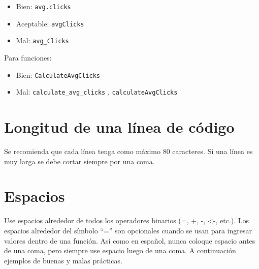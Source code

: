 \documentclass[10pt,]{krantz}
\begin{document}
\begin{itemize}
    \item Bien: \verb|avg.clicks|
    \item Aceptable: \verb|avgClicks|
    \item Mal: \verb|avg_Clicks|
\end{itemize}

Para funciones:

\begin{itemize}
    \item Bien: \verb|CalculateAvgClicks| 
    \item Mal: \verb|calculate_avg_clicks| , \verb|calculateAvgClicks|
\end{itemize}

\section{Longitud de una línea de
código}\label{longitud-de-una-linea-de-codigo}

Se recomienda que cada línea tenga como máximo 80 caracteres. Si una
línea es muy larga se debe cortar siempre por una coma.

\section{Espacios}\label{espacios}

Use espacios alrededor de todos los operadores binarios (=, +, -,
\textless{}-, etc.). Los espacios alrededor del símbolo ``='' son
opcionales cuando se usan para ingresar valores dentro de una función.
Así como en español, nunca coloque espacio antes de una coma, pero
siempre use espacio luego de una coma. A continuación ejemplos de buenas
y malas prácticas.
\end{document}
